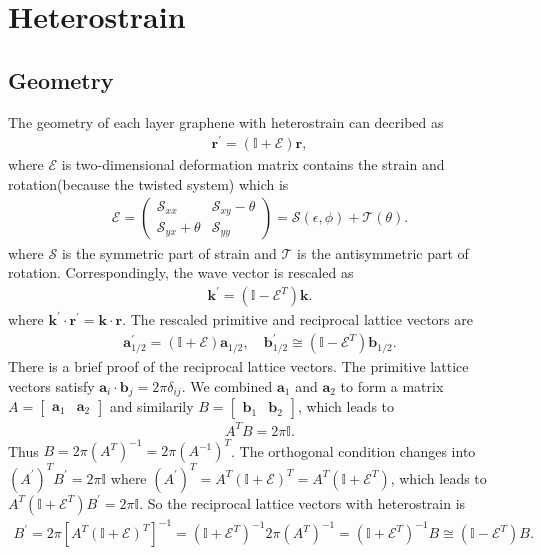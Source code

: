 \documentclass[10pt, oneside]{article}
\newcommand{\te}{\theta}
\newcommand{\pr}{\prime}
\newcommand{\p}[1]{\left(#1\right)}
\newcommand{\bb}[1]{\left[#1\right]}
\begin{document}
\section{Heterostrain}
\subsection{Geometry}
The geometry of each layer graphene with heterostrain can decribed as 
\begin{align}
	\bm{r}^\pr = \p{\mathbb{I} + \mathcal{E}} \bm{r},
\end{align}
where \(\mathcal{E}\) is two-dimensional deformation matrix contains the strain and rotation(because the twisted system) which is
\begin{align}
	\mathcal{E} = \begin{pmatrix}
		\mathcal{S}_{xx} & \mathcal{S}_{xy} - \te\\
		\mathcal{S}_{yx} + \te & \mathcal{S}_{yy}
 	\end{pmatrix} = \mathcal{S}\p{\epsilon, \phi} + \mathcal{T} \p{\te}.
\end{align}
where \(\mathcal{S}\) is the symmetric part of strain and \(\mathcal{T}\) is the antisymmetric part of rotation. Correspondingly, the wave vector is rescaled as
\begin{align}
	\bm{k}^\pr = \p{\mathbb{I} - \mathcal{E}^{T}} \bm{k}.
\end{align}
where \(\bm{k}^\pr \cdot \bm{r}^\pr = \bm{k} \cdot \bm{r}\). The rescaled primitive and reciprocal lattice vectors are 
\begin{align}
	\bm{a}^{\pr}_{1/2} = \p{\mathbb{I} + \mathcal{E}} \bm{a}_{1/2}, \quad \bm{b}^{\pr}_{1/2} \cong \p{\mathbb{I} - \mathcal{E}^{T}} \bm{b}_{1/2}.
\end{align}
There is a brief proof of the reciprocal lattice vectors. The primitive lattice vectors satisfy \(\bm{a}_{i} \cdot \bm{b}_{j} = 2 \pi \delta_{ij}\). We combined \(\bm{a}_{1}\) and \(\bm{a}_{2}\) to form a matrix \(A = \begin{bmatrix}
	\bm{a}_{1} & \bm{a}_{2}
\end{bmatrix}\) and similarily \(B = \begin{bmatrix}
	\bm{b}_{1} & \bm{b}_{2}
\end{bmatrix}\), which leads to 
\begin{align}
	A^{T} B = 2 \pi \mathbb{I}.
\end{align}
Thus \(B = 2 \pi \p{A^{T}}^{-1} = 2 \pi \p{A^{-1}}^{T}\). The orthogonal condition changes into \(\p{A^\pr}^{T} B^\pr = 2 \pi \mathbb{I}\) where \(\p{A^\pr}^{T} = A^{T} \p{\mathbb{I} + \mathcal{E}}^{T} = A^{T} \p{\mathbb{I} + \mathcal{E}^{T}}\), which leads to \(A^{T} \p{\mathbb{I} + \mathcal{E}^{T}}B^{\pr} = 2 \pi \mathbb{I}\). So the reciprocal lattice vectors with heterostrain is
\begin{align}
	B^\pr = 2 \pi \bb{A^{T} \p{\mathbb{I} + \mathcal{E}}^{T}}^{-1} = \p{\mathbb{I} + \mathcal{E}^{T}}^{-1} 2 \pi \p{A^{T}}^{-1} =  \p{\mathbb{I} + \mathcal{E}^{T}}^{-1} B \cong \p{\mathbb{I} - \mathcal{E}^{T}} B.
\end{align}
\end{document}
